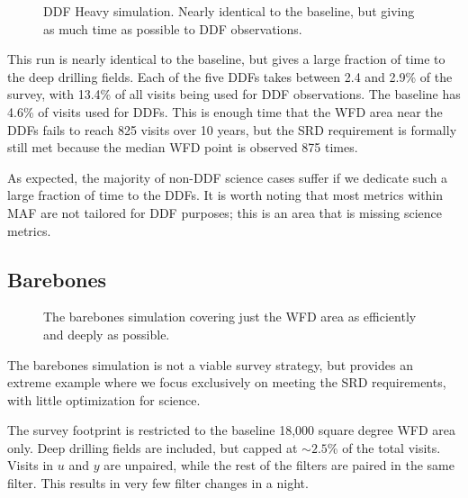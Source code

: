 \begin{figure}
\caption{DDF Heavy simulation. Nearly identical to the baseline, but giving as much time as possible to DDF observations.}\label{fig:ddfheavy}
\end{figure}


This run is nearly identical to the baseline, but gives a large fraction of time to the deep drilling fields. Each of the five DDFs takes between 2.4 and 2.9\% of the survey, with 13.4\% of all visits being used for DDF observations. The baseline has 4.6\% of visits used for DDFs.  This is enough time that the WFD area near the DDFs fails to reach 825 visits over 10 years, but the SRD requirement is formally still met because the median WFD point is observed 875 times.

As expected, the majority of non-DDF science cases suffer if we dedicate such a large fraction of time to the DDFs. It is worth noting that most metrics within MAF are not tailored for DDF purposes; this is an area that is missing science metrics.

\subsection{Barebones}\label{ss:1.6barebones}

\begin{figure}
\caption{The barebones simulation covering just the WFD area as efficiently and deeply as possible.}\label{fig:barebones}
\end{figure}


The barebones simulation is not a viable survey strategy, but provides an extreme example where we focus exclusively on meeting the SRD requirements, with little optimization for science.

The survey footprint is restricted to the baseline 18,000 square degree WFD area only. Deep drilling fields are included, but capped at $\sim2.5$\% of the total visits. Visits in $u$ and $y$ are unpaired, while the rest of the filters are paired in the same filter. This results in very few filter changes in a night. 

